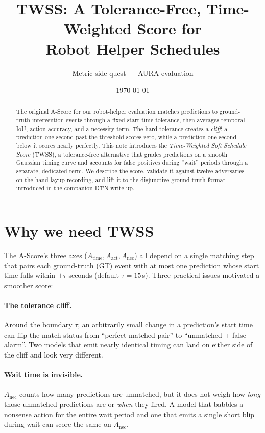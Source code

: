 \documentclass[11pt]{article}
\title{TWSS: A Tolerance-Free, Time-Weighted Score for\\Robot Helper Schedules}
\author{Metric side quest --- AURA evaluation}
\date{\today}
\begin{document}
\maketitle

\begin{abstract}
The original A-Score for our robot-helper evaluation matches predictions
to ground-truth intervention events through a fixed start-time
tolerance, then averages temporal-IoU, action accuracy, and a
necessity term. The hard tolerance creates a \emph{cliff}: a
prediction one second past the threshold scores zero, while a
prediction one second below it scores nearly perfectly. This note
introduces the \emph{Time-Weighted Soft Schedule Score} (TWSS), a
tolerance-free alternative that grades predictions on a smooth
Gaussian timing curve and accounts for false positives during
``wait'' periods through a separate, dedicated term. We describe the
score, validate it against twelve adversaries on the hand-layup
recording, and lift it to the disjunctive ground-truth format
introduced in the companion DTN write-up.
\end{abstract}

\section{Why we need TWSS}
\label{sec:motivation}

The A-Score's three axes ($A_{\text{time}}, A_{\text{act}},
A_{\text{nec}}$) all depend on a single matching step that pairs each
ground-truth (GT) event with at most one prediction whose start time
falls within $\pm\tau$ seconds (default $\tau = 15$\,s). Three
practical issues motivated a smoother score:

\paragraph{The tolerance cliff.}
Around the boundary $\tau$, an arbitrarily small change in a
prediction's start time can flip the match status from ``perfect
matched pair'' to ``unmatched + false alarm''. Two models that emit
nearly identical timing can land on either side of the cliff and look
very different.

\paragraph{Wait time is invisible.}
$A_{\text{nec}}$ counts how many predictions are unmatched, but it
does not weigh how \emph{long} those unmatched predictions are or
\emph{when} they fired. A model that babbles a nonsense action for
the entire wait period and one that emits a single short blip during
wait can score the same on $A_{\text{nec}}$.
\end{document}
